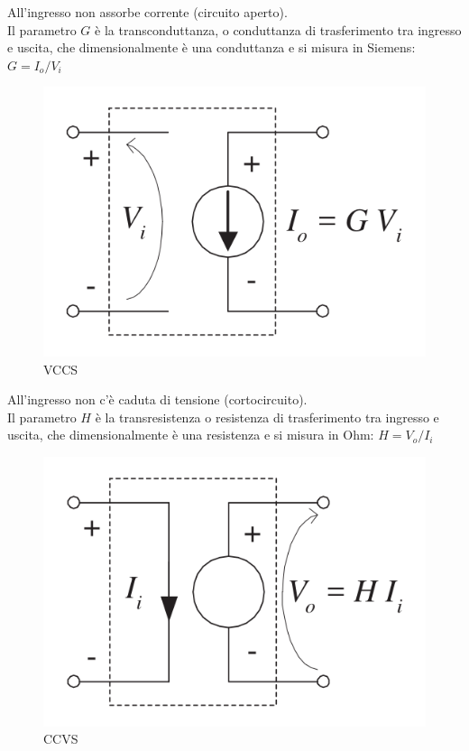 \begin{defn}
	All'ingresso non assorbe corrente (circuito aperto). \\
	Il parametro $G$ è la transconduttanza, o conduttanza di trasferimento tra ingresso e uscita, che dimensionalmente è una conduttanza e si misura in Siemens:
	$G = I_o / V_i$
	\begin{figure}[H]
		\centering
		\includegraphics[width=0.5\linewidth]{figures/VCCS.png}
		\caption{VCCS}
		\label{fig:VCCS}
	\end{figure}
\end{defn}

\begin{defn}
	All'ingresso non c'è caduta di tensione (cortocircuito). \\
	Il parametro $H$ è la transresistenza o resistenza di trasferimento tra ingresso e uscita, che dimensionalmente è una resistenza e si misura in Ohm:
	$H = V_o / I_i$
	\begin{figure}[H]
		\centering
		\includegraphics[width=0.5\linewidth]{figures/CCVS.png}
		\caption{CCVS}
		\label{fig:CCVS}
	\end{figure}
\end{defn}

